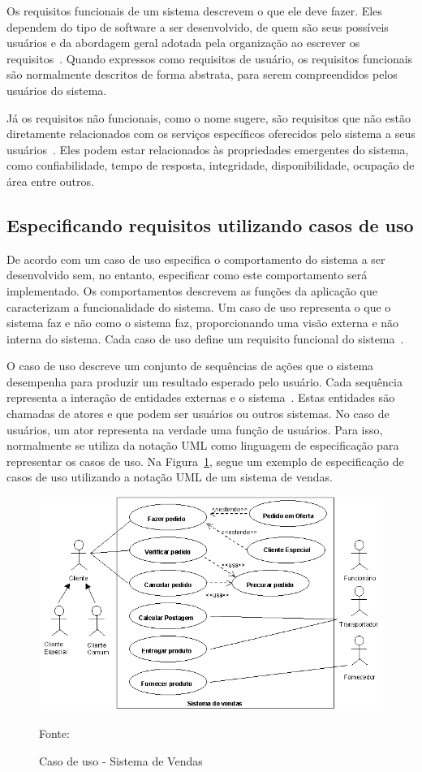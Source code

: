 Os requisitos funcionais de um sistema descrevem o que ele deve fazer.
Eles dependem do tipo de software a ser desenvolvido, de quem são seus possíveis usuários e da abordagem geral adotada pela organização ao escrever os requisitos~\cite{Sommerville}.
Quando expressos como requisitos de usuário, os requisitos funcionais são normalmente descritos de forma abstrata, para serem compreendidos pelos usuários do sistema.\label{texto:requisito_funcional}

Já os requisitos não funcionais, como o nome sugere, são requisitos que não estão diretamente relacionados com os serviços específicos oferecidos pelo sistema a seus usuários~\cite{Sommerville}.
Eles podem estar relacionados às propriedades emergentes do sistema, como confiabilidade, tempo de resposta, integridade, disponibilidade, ocupação de área entre outros.\label{texto:requisito_nao_funcional}

\subsection{Especificando requisitos utilizando casos de uso}

De acordo com  um caso de uso especifica o comportamento do sistema a ser desenvolvido sem, no entanto, especificar como este comportamento será implementado.
Os comportamentos descrevem as funções da aplicação que caracterizam a funcionalidade do sistema.
Um caso de uso representa o que o sistema faz e não como o sistema faz, proporcionando uma visão externa e não interna do sistema. Cada caso de uso define um requisito funcional do sistema~\cite{ReqJair}.

O caso de uso descreve um conjunto de sequências de ações que o sistema desempenha para produzir um resultado esperado pelo usuário.
Cada sequência representa a interação de entidades externas e o sistema~\cite{ReqJair}.
Estas entidades são chamadas de atores e que podem ser usuários ou outros sistemas.
No caso de usuários, um ator representa na verdade uma função de usuários. Para isso, normalmente se utiliza da notação UML como linguagem de especificação para representar os casos de uso. Na Figura~\ref{cap:02:fig:caso-de-uso-exemplo}, segue um exemplo de especificação de casos de uso utilizando a notação UML de um sistema de vendas.\label{texto:especificando-com-casos-de-uso}

\begin{figure}[htb!]
\centering
\includegraphics[width=0.7\linewidth]{src/imagens/casosd2.png}
\caption{Caso de uso - Sistema de Vendas} Fonte:~\cite{ReqJair2}
\label{cap:02:fig:caso-de-uso-exemplo}
\end{figure}

